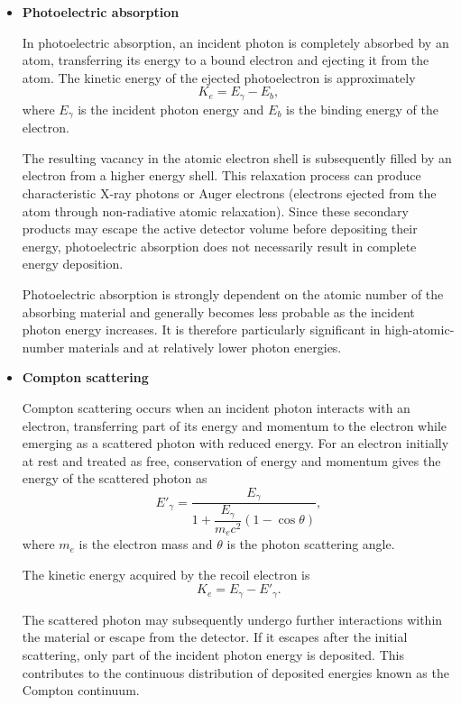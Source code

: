 \begin{itemize}
\item{\textbf{Photoelectric absorption}}

In photoelectric absorption, an incident photon is completely absorbed by an atom, transferring its energy to a bound electron and ejecting it from the atom. The kinetic energy of the ejected photoelectron is approximately
\begin{equation}
    K_e=E_\gamma-E_b,
\end{equation}
where $E_\gamma$ is the incident photon energy and $E_b$ is the binding energy of the electron.

The resulting vacancy in the atomic electron shell is subsequently filled by an electron from a higher energy shell. This relaxation process can produce characteristic X-ray photons or Auger electrons (electrons ejected from the atom through non-radiative atomic relaxation). Since these secondary products may escape the active detector volume before depositing their energy, photoelectric absorption does not necessarily result in complete energy deposition.

Photoelectric absorption is strongly dependent on the atomic number of the absorbing material and generally becomes less probable as the incident photon energy increases. It is therefore particularly significant in high-atomic-number materials and at relatively lower photon energies.

\item{\textbf{Compton scattering}}

Compton scattering occurs when an incident photon interacts with an electron, transferring part of its energy and momentum to the electron while emerging as a scattered photon with reduced energy. For an electron initially at rest and treated as free, conservation of energy and momentum gives the energy of the scattered photon as
\begin{equation}
    E'_\gamma =
    \frac{E_\gamma}
    {1+\dfrac{E_\gamma}{m_ec^2}(1-\cos\theta)},
\end{equation}
where $m_e$ is the electron mass and $\theta$ is the photon scattering angle.

The kinetic energy acquired by the recoil electron is
\begin{equation}
    K_e=E_\gamma-E'_\gamma.
\end{equation}

The scattered photon may subsequently undergo further interactions within the material or escape from the detector. If it escapes after the initial scattering, only part of the incident photon energy is deposited. This contributes to the continuous distribution of deposited energies known as the Compton continuum.


\end{itemize}
